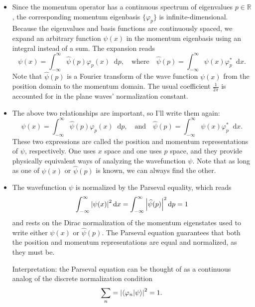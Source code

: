 \documentclass[11pt, a4paper]{article}
\newcommand{\diff}{\mathop{}\!\mathrm{d}} %
\newcommand{\F}[1]{\widehat{#1}} %
\begin{document}
\begin{itemize}
    \item Since the momentum operator has a continuous spectrum of eigenvalues $ p \in \mathbb{R} $, the corresponding momentum eigenbasis $ \{\varphi_{p}\} $ is infinite-dimensional. Because the eigenvalues and basis functions are continuously spaced, we expand an arbitrary function $ \psi(x) $ in the momentum eigenbasis using an integral instead of a sum. The expansion reads
    \begin{equation*}
        \psi(x) = \int_{-\infty}^{\infty}\F{\psi}(p)\varphi_{p}(x)\diff p, \quad \text{where} \quad \F{\psi}(p) = \int_{-\infty}^{\infty}\psi(x)\varphi_{p}^{*} \diff x.
    \end{equation*}
    Note that $ \F{\psi}(p) $ is a Fourier transform of the wave function $ \psi(x) $ from the position domain to the momentum domain. The usual coefficient $ \frac{1}{2\pi} $ is accounted for in the plane waves' normalization constant. 

    \item The above two relationships are important, so I'll write them again:
    \begin{equation*}
        \psi(x) = \int_{-\infty}^{\infty}\F{\psi}(p)\varphi_{p}(x)\diff p, \quad \text{and} \quad \F{\psi}(p) = \int_{-\infty}^{\infty}\psi(x)\varphi_{p}^{*} \diff x.
    \end{equation*}
    These two expressions are called the position and momentum representations of $ \psi $, respectively. One uses $ x $ space and one uses $ p $ space, and they provide physically equivalent ways of analyzing the wavefunction $ \psi $. Note that as long as one of $ \psi(x) $ or $ \F{\psi}(p) $ is known, we can always find the other.

    \item The wavefunction $ \psi $ is normalized by the Parseval equality, which reads
    \begin{equation*}
        \int_{-\infty}^{\infty}\abs{\psi(x)}^{2} \diff x = \int_{-\infty}^{\infty}\abs{\F{\psi}(p)}^{2}\diff p = 1
    \end{equation*}
    and rests on the Dirac normalization of the momentum eigenstates used to write either $ \psi(x) $ or $ \F{\psi}(p) $. The Parseval equation guarantees that both the position and momentum representations are equal and normalized, as they must be.

    Interpretation: the Parseval equation can be thought of as a continuous analog of the discrete normalization condition
    \begin{equation*}
        \sum_{n} = \abs{\braket{\varphi_{n}}{\psi}}^{2} = 1.
    \end{equation*}
    

\end{itemize}
\end{document}
